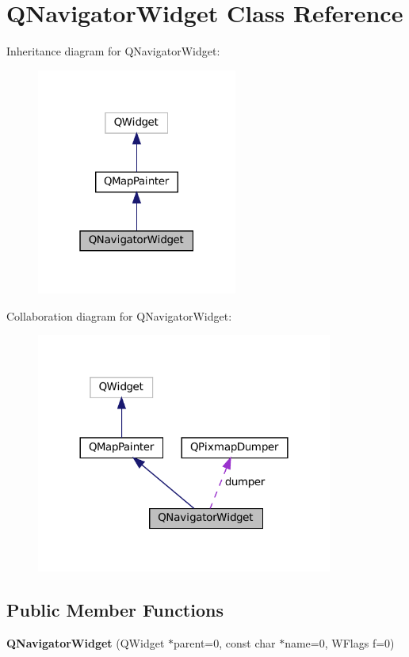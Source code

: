 \hypertarget{classQNavigatorWidget}{}\section{Q\+Navigator\+Widget Class Reference}
\label{classQNavigatorWidget}


Inheritance diagram for Q\+Navigator\+Widget\+:
\nopagebreak
\begin{figure}[H]
\begin{center}
\leavevmode
\includegraphics[width=187pt]{classQNavigatorWidget__inherit__graph}
\end{center}
\end{figure}


Collaboration diagram for Q\+Navigator\+Widget\+:
\nopagebreak
\begin{figure}[H]
\begin{center}
\leavevmode
\includegraphics[width=276pt]{classQNavigatorWidget__coll__graph}
\end{center}
\end{figure}
\subsection*{Public Member Functions}
\begin{DoxyCompactItemize}
\item 
\mbox{\label{classQNavigatorWidget_aac53596e6b5e5f32b24fcfb5ec4f7a77}} 
{\bfseries Q\+Navigator\+Widget} (Q\+Widget $\ast$parent=0, const char $\ast$name=0, W\+Flags f=0)
\end{DoxyCompactItemize}
